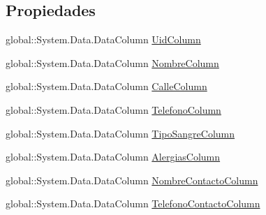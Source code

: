 \subsection*{Propiedades}
\begin{DoxyCompactItemize}
\item 
global\-::\-System.\-Data.\-Data\-Column \hyperlink{class_proyecto___integrador__3_1_1ds_usuarios_1_1_usuarios_data_table_a35a1525ef5d75a20c0781c4163a53610}{Uid\-Column}
\item 
global\-::\-System.\-Data.\-Data\-Column \hyperlink{class_proyecto___integrador__3_1_1ds_usuarios_1_1_usuarios_data_table_aa73ca2ed9aaabb05af840aac3bd943f5}{Nombre\-Column}
\item 
global\-::\-System.\-Data.\-Data\-Column \hyperlink{class_proyecto___integrador__3_1_1ds_usuarios_1_1_usuarios_data_table_acbf55d075ab35bd85f1efb354bb744b4}{Calle\-Column}
\item 
global\-::\-System.\-Data.\-Data\-Column \hyperlink{class_proyecto___integrador__3_1_1ds_usuarios_1_1_usuarios_data_table_ac740a752802c6cb9a3ed8f4c1990f750}{Telefono\-Column}
\item 
global\-::\-System.\-Data.\-Data\-Column \hyperlink{class_proyecto___integrador__3_1_1ds_usuarios_1_1_usuarios_data_table_a73c18d0ad197d7314db69321b8d77d96}{Tipo\-Sangre\-Column}
\item 
global\-::\-System.\-Data.\-Data\-Column \hyperlink{class_proyecto___integrador__3_1_1ds_usuarios_1_1_usuarios_data_table_ae6535f8c6396d4fc1073655a15c1207d}{Alergias\-Column}
\item 
global\-::\-System.\-Data.\-Data\-Column \hyperlink{class_proyecto___integrador__3_1_1ds_usuarios_1_1_usuarios_data_table_ad0071571b88896ada8f0747ec5e441e2}{Nombre\-Contacto\-Column}
\item 
global\-::\-System.\-Data.\-Data\-Column \hyperlink{class_proyecto___integrador__3_1_1ds_usuarios_1_1_usuarios_data_table_aab76d3089d1ea9ee22016e085deace10}{Telefono\-Contacto\-Column}

\end{DoxyCompactItemize}
